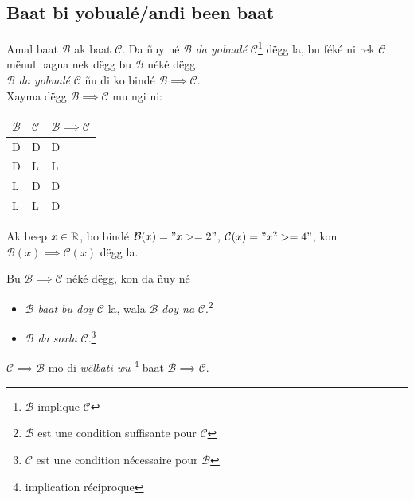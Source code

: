 \documentclass[twoside, a4paper]{article}
\begin{document}
\subsection{Baat bi yobualé/andi been baat}
\begin{tcolorbox}[enhanced jigsaw,breakable,pad at break*=1mm, colback=red!5!white,colframe=white!75!black,title= Téeki,
    watermark color=white]
  Amal baat $\mathcal{B}$ ak baat $\mathcal{C}$. Da ñuy né $\mathcal{B}$ \textit{da yobualé  }$\mathcal{C}$\footnote{$\mathcal{B}$ implique $\mathcal{C}$} dëgg la, bu féké ni rek $\mathcal{C}$ mënul bagna nek dëgg bu $\mathcal{B}$ néké dëgg.\\
  $\mathcal{B}$ \textit{da yobualé  }$\mathcal{C}$  ñu di ko bindé $\mathcal{B} \implies \mathcal{C}$.\\

  Xayma dëgg $\mathcal{B} \implies \mathcal{C}$ mu ngi ni:\\

  \begin{tabularx}{0.8\textwidth} {
      | >{\centering\arraybackslash}X
      | >{\centering\arraybackslash}X
      | >{\centering\arraybackslash}X |}
    \hline
    $\mathcal{B}$ & $\mathcal{C}$ & $\mathcal{B}\implies\mathcal{C}$ \\
    \hline
    D             & D             & D                                \\
    D             & L             & L                                \\
    L             & D             & D                                \\
    L             & L             & D                                \\
    \hline
  \end{tabularx}
\end{tcolorbox}

Ak beep $x\in\mathbb{R}$, bo bindé $\mathcal{B}(x) = "x >= 2"$, $\mathcal{C}(x) = "x^2 >= 4"$, kon $\mathcal{B}(x) \implies \mathcal{C}(x)$ dëgg la.


\begin{tcolorbox}[enhanced jigsaw,breakable,pad at break*=1mm, colback=red!5!white,colframe=white!75!black,title= Téeki,
    watermark color=white]
  Bu $\mathcal{B} \implies \mathcal{C}$ néké dëgg, kon da ñuy né
  \begin{itemize}
    \item $\mathcal{B}$ \textit{baat bu doy} $\mathcal{C}$ la, wala $\mathcal{B}$ \textit{doy na} $\mathcal{C}$.\footnote{$\mathcal{B}$ est une condition suffisante pour $\mathcal{C}$}
    \item $\mathcal{B}$ \textit{da soxla} $\mathcal{C}$.\footnote{$\mathcal{C}$ est une condition nécessaire pour $\mathcal{B}$}
  \end{itemize}

  $\mathcal{C} \implies \mathcal{B}$ mo di \textit{wëlbati wu} \footnote{implication réciproque} baat $\mathcal{B} \implies \mathcal{C}$.
\end{tcolorbox}
\end{document}
